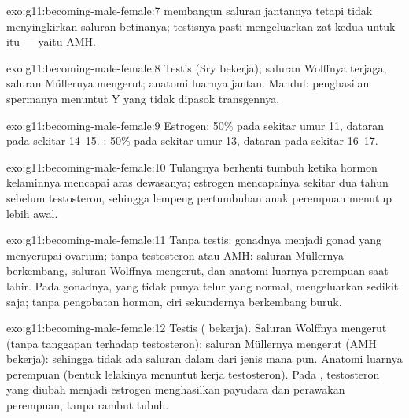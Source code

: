 \begin{solution}{exo:g11:becoming-male-female:7}
 membangun saluran jantannya tetapi tidak menyingkirkan
saluran betinanya; testisnya pasti mengeluarkan zat kedua untuk itu ---
yaitu AMH.
\end{solution}

\begin{solution}{exo:g11:becoming-male-female:8}
Testis (Sry bekerja); saluran Wolffnya terjaga, saluran Müllernya
mengerut; anatomi luarnya jantan. Mandul: penghasilan spermanya
menuntut  Y yang tidak dipasok transgennya.
\end{solution}

\begin{solution}{exo:g11:becoming-male-female:9}
Estrogen: 50\% pada sekitar umur 11, dataran pada sekitar 14--15.
: 50\% pada sekitar umur 13, dataran pada sekitar 16--17.
\end{solution}

\begin{solution}{exo:g11:becoming-male-female:10}
Tulangnya berhenti tumbuh ketika hormon kelaminnya mencapai aras
dewasanya; estrogen mencapainya sekitar dua tahun sebelum testosteron,
sehingga lempeng pertumbuhan anak perempuan menutup lebih awal.
\end{solution}

\begin{solution}{exo:g11:becoming-male-female:11}
Tanpa testis: gonadnya menjadi gonad yang menyerupai ovarium; tanpa
testosteron atau AMH: saluran Müllernya berkembang, saluran Wolffnya
mengerut, dan anatomi luarnya perempuan saat lahir. Pada 
gonadnya, yang tidak punya  telur yang normal, mengeluarkan sedikit
saja; tanpa pengobatan hormon, ciri sekundernya berkembang buruk.
\end{solution}

\begin{solution}{exo:g11:becoming-male-female:12}
Testis ( bekerja). Saluran Wolffnya mengerut (tanpa tanggapan
terhadap testosteron); saluran Müllernya mengerut (AMH bekerja):
sehingga tidak ada saluran dalam dari jenis mana pun. Anatomi luarnya
perempuan (bentuk lelakinya menuntut kerja testosteron). Pada
, testosteron yang diubah menjadi estrogen menghasilkan
payudara dan perawakan perempuan, tanpa rambut tubuh.
\end{solution}

